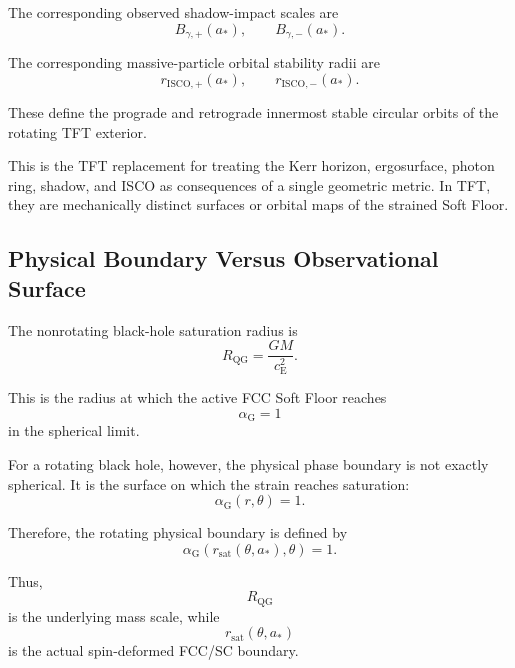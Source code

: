 The corresponding observed shadow-impact scales are
\begin{equation}
    B_{\gamma,+}(a_\ast), \qquad B_{\gamma,-}(a_\ast).
\end{equation}

The corresponding massive-particle orbital stability radii are
\begin{equation}
    r_{\mathrm{ISCO},+}(a_\ast), \qquad r_{\mathrm{ISCO},-}(a_\ast).
\end{equation}

These define the prograde and retrograde innermost stable circular orbits of the rotating TFT exterior.

This is the TFT replacement for treating the Kerr horizon, ergosurface, photon ring, shadow, and ISCO as consequences of a single geometric metric. In TFT, they are mechanically distinct surfaces or orbital maps of the strained Soft Floor.

\subsection{Physical Boundary Versus Observational Surface}

The nonrotating black-hole saturation radius is
\begin{equation}
    R_{\mathrm{QG}} = \frac{GM}{c_{\mathrm{E}}^2}.
\end{equation}

This is the radius at which the active FCC Soft Floor reaches
\begin{equation}
    \alpha_{\mathrm{G}} = 1
\end{equation}
in the spherical limit.

For a rotating black hole, however, the physical phase boundary is not exactly spherical. It is the surface on which the strain reaches saturation:
\begin{equation}
    \alpha_{\mathrm{G}}(r,\theta) = 1.
\end{equation}

Therefore, the rotating physical boundary is defined by
\begin{equation}
    \boxed{ \alpha_{\mathrm{G}}(r_{\mathrm{sat}}(\theta,a_\ast),\theta) = 1. }
\end{equation}

Thus,
\begin{equation}
    R_{\mathrm{QG}}
\end{equation}
is the underlying mass scale, while
\begin{equation}
    r_{\mathrm{sat}}(\theta,a_\ast)
\end{equation}
is the actual spin-deformed FCC/SC boundary.

